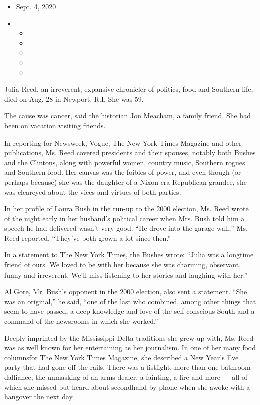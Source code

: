 \begin{itemize}
\item
  Sept. 4, 2020
\item
  \begin{itemize}
  \item
  \item
  \item
  \item
  \item
  \end{itemize}
\end{itemize}

Julia Reed, an irreverent, expansive chronicler of politics, food and
Southern life, died on Aug. 28 in Newport, R.I. She was 59.

The cause was cancer, said the historian Jon Meacham, a family friend.
She had been on vacation visiting friends.

In reporting for Newsweek, Vogue, The New York Times Magazine and other
publications, Ms. Reed covered presidents and their spouses, notably
both Bushes and the Clintons, along with powerful women, country music,
Southern rogues and Southern food. Her canvas was the foibles of power,
and even though (or perhaps because) she was the daughter of a Nixon-era
Republican grandee, she was cleareyed about the vices and virtues of
both parties.

In her profile of Laura Bush in the run-up to the 2000 election, Ms.
Reed wrote of the night early in her husband's political career when
Mrs. Bush told him a speech he had delivered wasn't very good. ``He
drove into the garage wall,'' Ms. Reed reported. ``They've both grown a
lot since then.''

In a statement to The New York Times, the Bushes wrote: ``Julia was a
longtime friend of ours. We loved to be with her because she was
charming, observant, funny and irreverent. We'll miss listening to her
stories and laughing with her.''

Al Gore, Mr. Bush's opponent in the 2000 election, also sent a
statement. ``She was an original,'' he said, ``one of the last who
combined, among other things that seem to have passed, a deep knowledge
and love of the self-conscious South and a command of the newsrooms in
which she worked.''

Deeply imprinted by the Mississippi Delta traditions she grew up with,
Ms. Reed was as well known for her entertaining as her journalism. In
\href{https://www.nytimes3xbfgragh.onion/2002/11/10/magazine/the-morning-after.html}{one
of her many food columns}for The New York Times Magazine, she described
a New Year's Eve party that had gone off the rails. There was a
fistfight, more than one bathroom dalliance, the unmasking of an arms
dealer, a fainting, a fire and more --- all of which she missed but
heard about secondhand by phone when she awoke with a hangover the next
day.

